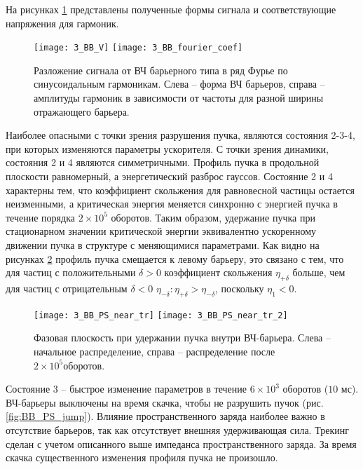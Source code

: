 \noindent На рисунках \ref{fig:wave} представлены полученные формы сигнала и со\-от\-вет\-ству\-ющ\-ие напряжения для гармоник.

\begin{figure}[!h]
   \texttt{[image: 3\_BB\_V]}
   \texttt{[image: 3\_BB\_fourier\_coef]}
   \caption{Разложение сигнала от ВЧ барьерного типа в ряд Фурье по синусоидальным гармоникам. Слева – форма 
   ВЧ барьеров, справа – амплитуды гармоник в зависимости от частоты для разной ширины отражающего барьера.}
   \label{fig:wave}
\end{figure}

\par Наиболее опасными с точки зрения разрушения пучка, являются со\-сто\-я\-ния 2-3-4, при которых изменяются параметры ускорителя. С точки зрения динамики, состояния 2 и 4 являются симметричными. Профиль пучка в продольной плоскости равномерный, а э\-нер\-ге\-ти\-чес\-кий разброс гауссов. Состояние 2 и 4 характерны тем, что коэффициент скольжения для равновесной частицы остается неизменными, а кри\-ти\-чес\-кая энергия меняется синхронно с энергией пучка в течение порядка $2\times{10}^5$ оборотов. Таким образом, удержание пучка при стационарном значении критической энергии эквивалентно ускоренному движении пуч\-ка в структуре с меняющимися параметрами. Как видно на рисунках \ref{fig:BB_PS_near_tr} профиль пучка смещается к левому барьеру, это связано с тем, что для частиц с положительными $\delta>0$ коэффициент скольжения $\eta_{+\delta}$ больше, чем для частиц с отрицательным $\delta<0$ $\eta_{-\delta}: \eta_{+\delta}>\eta_{-\delta}$, поскольку $\eta_1<0$. 

\begin{figure}
   \texttt{[image: 3\_BB\_PS\_near\_tr]}
   \texttt{[image: 3\_BB\_PS\_near\_tr\_2]}
   \caption{Фазовая плоскость при удержании пучка внутри ВЧ-барьера. Слева – начальное распределение, справа – распределение после $2\times{10}^5 оборотов$.}
   \label{fig:BB_PS_near_tr}
\end{figure}

\par Состояние 3 – быстрое изменение параметров в течение $6\times{10}^3$ о\-бо\-ро\-тов ($10$ мс). ВЧ-барьеры выключены на время скачка, чтобы не разрушить пучок (рис. \ref{fig:BB_PS_jump}).  Влияние пространственного заряда наиболее важно в отсутствие барь\-е\-ров, так как отсутствует внешняя удерживающая сила. Трекинг сделан с учетом описанного выше импеданса пространственного заряда. За время скачка существенного изменения профиля пучка не про\-и\-зош\-ло.

